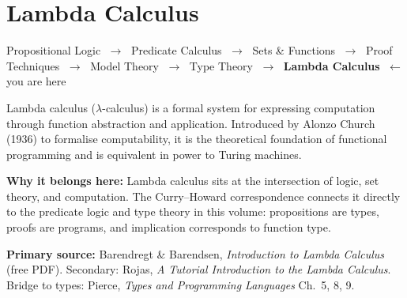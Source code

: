 \chapter{Lambda Calculus}

\begin{tcolorbox}[
  colback=gray!6,
  colframe=gray!40,
  arc=2pt,
  left=8pt, right=8pt, top=6pt, bottom=6pt,
  title={\small\textbf{Where You Are in the Journey}},
  fonttitle=\small\bfseries
]
\begin{center}
\small
Propositional Logic
$\;\to\;$ Predicate Calculus
$\;\to\;$ Sets \& Functions
$\;\to\;$ Proof Techniques
$\;\to\;$ Model Theory
$\;\to\;$ Type Theory
$\;\to\;$ \textbf{Lambda Calculus} $\;\leftarrow$ you are here
\end{center}
\end{tcolorbox}

\vspace{0.5em}

\begin{tcolorbox}[
  colback=blue!4,
  colframe=blue!30,
  arc=2pt,
  left=8pt, right=8pt, top=6pt, bottom=6pt,
  title={\small\textbf{Chapter Overview}},
  fonttitle=\small\bfseries
]
\small
Lambda calculus ($\lambda$-calculus) is a formal system for expressing
computation through function abstraction and application.
Introduced by Alonzo Church (1936) to formalise computability,
it is the theoretical foundation of functional programming
and is equivalent in power to Turing machines.

\medskip
\textbf{Why it belongs here:} Lambda calculus sits at the intersection
of logic, set theory, and computation.
The Curry--Howard correspondence connects it directly to the
predicate logic and type theory in this volume:
propositions are types, proofs are programs, and
implication corresponds to function type.

\medskip
\textbf{Primary source:} Barendregt \& Barendsen,
\textit{Introduction to Lambda Calculus} (free PDF).
Secondary: Rojas, \textit{A Tutorial Introduction to the Lambda Calculus}.
Bridge to types: Pierce, \textit{Types and Programming Languages} Ch.\ 5, 8, 9.
\end{tcolorbox}

\vspace{0.5em}

